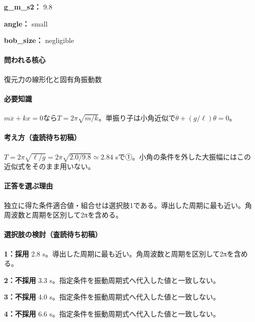 \noindent\textbf{g\_m\_s2：} 9.8\par

\noindent\textbf{angle：} small\par

\noindent\textbf{bob\_size：} negligible\par

\paragraph{問われる核心} 復元力の線形化と固有角振動数

\paragraph{必要知識} \(m\ddot x+kx=0\)なら\(T=2\pi\sqrt{m/k}\)。単振り子は小角近似で\(\ddot\theta+(g/\ell)\theta=0\)。

\paragraph{考え方（査読待ち初稿）} \(T=2\pi\sqrt{\ell/g}=2\pi\sqrt{2.0/9.8}\simeq2.84\) sで①。小角の条件を外した大振幅にはこの近似式をそのまま用いない。

\paragraph{正答を選ぶ理由} 独立に得た条件適合値・組合せは選択肢1である。導出した周期に最も近い。角周波数と周期を区別して2πを含める。

\paragraph{選択肢の検討（査読待ち初稿）}\mbox{}\par

\noindent\textbf{1：採用} 2.8 s。導出した周期に最も近い。角周波数と周期を区別して2πを含める。\par

\noindent\textbf{2：不採用} 3.3 s。指定条件を振動周期式へ代入した値と一致しない。\par

\noindent\textbf{3：不採用} 4.0 s。指定条件を振動周期式へ代入した値と一致しない。\par

\noindent\textbf{4：不採用} 6.6 s。指定条件を振動周期式へ代入した値と一致しない。\par


